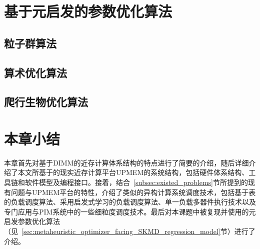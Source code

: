 \section{基于元启发的参数优化算法}\label{subsec:metaheuristic_based_args_optimization_intro}
    \subsection{粒子群算法}\label{subsec:PSO_algorithm}
    \subsection{算术优化算法}\label{subsec:AOA_algorithm}
    \subsection{爬行生物优化算法}\label{subsec:RSA_algorithm}

\section{本章小结}\label{sec:chap2_summary}
本章首先对基于DIMM的近存计算体系结构的特点进行了简要的介绍，随后详细介绍了本文所基于的现实近存计算平台UPMEM的系统结构，包括硬件体系结构、工具链和软件模型及编程接口。接着，结合~\ref{subsec:existed_problems}节所提到的现有问题与UPMEM平台的特性，介绍了类似的异构计算系统调度技术，包括基于表的负载调度算法、采用启发式学习的负载调度算法、单一负载多器件执行技术以及专门应用与PIM系统中的一些细粒度调度技术。最后对本课题中被复现并使用的元启发参数优化算法（见~\ref{sec:metaheuristic_optimizer_facing_SKMD_regression_model}节）进行了介绍。

